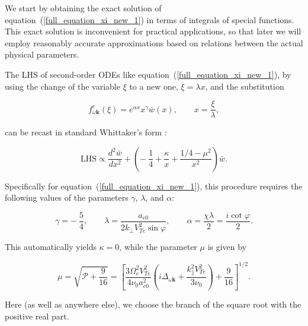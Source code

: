 \documentclass[draft]{agujournal2019}
\renewcommand{\vec}{\mathbf}
\begin{document}

We start by obtaining the exact solution of equation~(\ref{full_equation_xi_new_1}) in terms of integrals of special 
functions. This exact solution is inconvenient for practical applications, so that later we will employ
reasonably accurate approximations based on relations between the actual
physical parameters.

The LHS of second-order ODEs like equation~(\ref{full_equation_xi_new_1}), by
using the change of the variable $\xi$ to a new one, $\xi=\lambda x$, and the substitution
\begin{linenomath*}
\begin{equation}
f_{\omega\vec{k}}^{e}(\xi)=e^{\alpha x}x^{\gamma}\bar{w}(x), \qquad x=\frac{\xi}{\lambda},
\label{y(x)_via_w}
\end{equation}
\end{linenomath*}
can be recast in standard Whittaker's form \cite{Abramowitz:Handbook88}:
\begin{linenomath*}
\begin{equation}
\text{LHS}\propto\frac{d^{2}\bar{w}}{dx^{2}}+\left(  -\ \frac{1}{4}%
+\frac{\kappa}{x}+\frac{1/4-\mu^{2}}{x^{2}}\right)  \bar{w}.
\label{Whittaker}
\end{equation}
\end{linenomath*}
Specifically for equation~(\ref{full_equation_xi_new_1}), this procedure 
requires the following values of the parameters $\gamma$, $\lambda$, and $\alpha$:
\begin{linenomath*}
\begin{equation}
\gamma=-\ \frac{5}{4},\qquad\lambda=\frac{a_{e0}}{2k_{\perp}V_{Te}^{2}
\sin\varphi},\qquad\alpha=\frac{\chi\lambda}{2}=\frac{i\cot\varphi}{2}.
\label{gamma,alpha,kappa}
\end{equation}
\end{linenomath*}
This automatically yields $\kappa=0$, while the parameter $\mu$ is
given by
\begin{linenomath*}
\begin{equation}
\mu=\sqrt{\mathcal{P}+\frac{9}{16}}=\left[  \frac{3\Omega_{e}^{2}V_{Te}^{2}%
}{4\nu_{0}a_{e0}^{2}}\left(  i\Delta_{\omega\vec{k}}+\frac{k_{\|}%
^{2}V_{Te}^{2}}{3\nu_{0}}\right)  +\frac{9}{16}\right]  ^{1/2}.
\label{mu==}
\end{equation}
\end{linenomath*}
Here (as well as anywhere else), we choose the branch of the square root with the positive real part.
\end{document}
